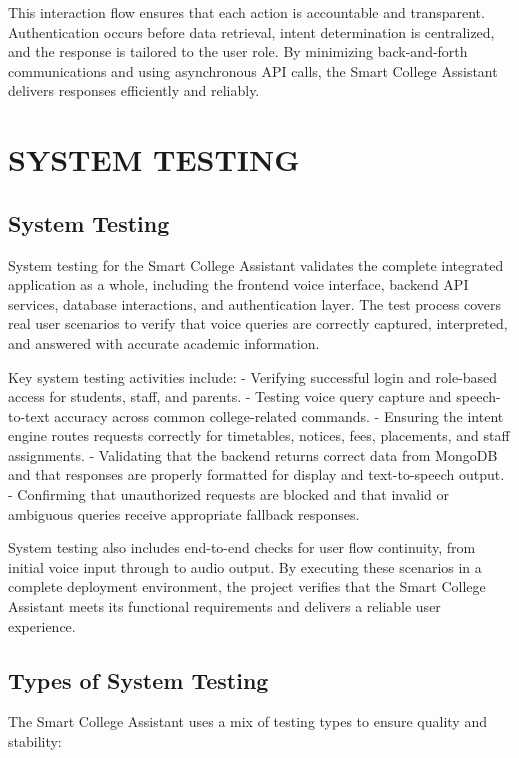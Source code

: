 \documentclass{article}
\begin{document}
This interaction flow ensures that each action is accountable and transparent. Authentication occurs before data retrieval, intent determination is centralized, and the response is tailored to the user role. By minimizing back-and-forth communications and using asynchronous API calls, the Smart College Assistant delivers responses efficiently and reliably.

\section{SYSTEM TESTING}

\subsection{System Testing}
System testing for the Smart College Assistant validates the complete integrated application as a whole, including the frontend voice interface, backend API services, database interactions, and authentication layer. The test process covers real user scenarios to verify that voice queries are correctly captured, interpreted, and answered with accurate academic information.

Key system testing activities include:
- Verifying successful login and role-based access for students, staff, and parents.
- Testing voice query capture and speech-to-text accuracy across common college-related commands.
- Ensuring the intent engine routes requests correctly for timetables, notices, fees, placements, and staff assignments.
- Validating that the backend returns correct data from MongoDB and that responses are properly formatted for display and text-to-speech output.
- Confirming that unauthorized requests are blocked and that invalid or ambiguous queries receive appropriate fallback responses.

System testing also includes end-to-end checks for user flow continuity, from initial voice input through to audio output. By executing these scenarios in a complete deployment environment, the project verifies that the Smart College Assistant meets its functional requirements and delivers a reliable user experience.

\subsection{Types of System Testing}
The Smart College Assistant uses a mix of testing types to ensure quality and stability:
\end{document}
